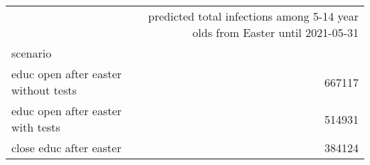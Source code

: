 \begin{tabular}{lr}
\toprule
{} &  predicted total infections among 5-14 year olds from Easter until 2021-05-31 \\
scenario                               &                                                                               \\
\midrule
 educ open after easter  without tests &                                             667117 \\
 educ open after easter  with tests    &                                             514931 \\
 close educ after easter               &                                             384124 \\
\bottomrule
\end{tabular}
